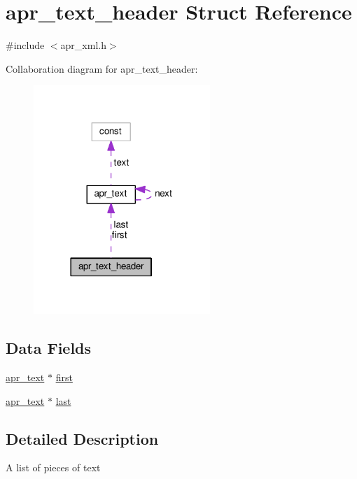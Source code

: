 \hypertarget{structapr__text__header}{}\section{apr\+\_\+text\+\_\+header Struct Reference}
\label{structapr__text__header}


{\ttfamily \#include $<$apr\+\_\+xml.\+h$>$}



Collaboration diagram for apr\+\_\+text\+\_\+header\+:
\nopagebreak
\begin{figure}[H]
\begin{center}
\leavevmode
\includegraphics[width=189pt]{structapr__text__header__coll__graph}
\end{center}
\end{figure}
\subsection*{Data Fields}
\begin{DoxyCompactItemize}
\item 
\hyperlink{structapr__text}{apr\+\_\+text} $\ast$ \hyperlink{structapr__text__header_a6db03d272f5e56058c84e10e49624c0b}{first}
\item 
\hyperlink{structapr__text}{apr\+\_\+text} $\ast$ \hyperlink{structapr__text__header_a3ebe57b46d323b8cefaba1e114acf09e}{last}
\end{DoxyCompactItemize}


\subsection{Detailed Description}
A list of pieces of text 

